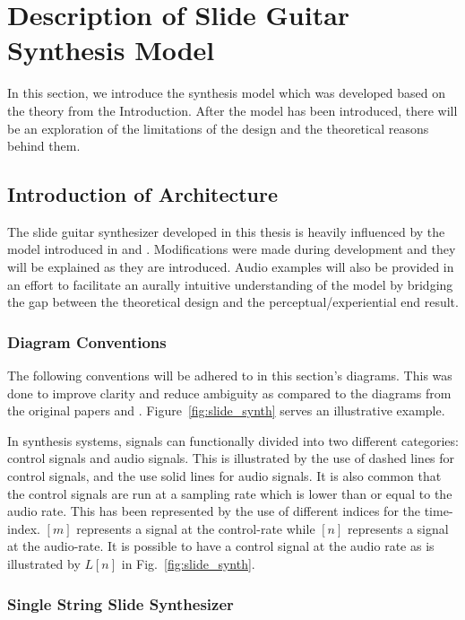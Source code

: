 \documentclass[../main.tex]{subfiles}
\begin{document}
\chapter{Description of Slide Guitar Synthesis Model}
In this section, we introduce the synthesis model which was developed based on the theory from the Introduction. After the model has been introduced, there will be an exploration of the limitations of the design and the theoretical reasons behind them.

\section{Introduction of Architecture}
The slide guitar synthesizer developed in this thesis is heavily influenced by the model introduced in  and . Modifications were made during development and they will be explained as they are introduced. Audio examples will also be provided in an effort to facilitate an aurally intuitive understanding of the model by bridging the gap between the theoretical design and the perceptual/experiential end result.

\subsection{Diagram Conventions}
The following conventions will be adhered to in this section's diagrams. This was done to improve clarity and reduce ambiguity as compared to the diagrams from the original papers  and . Figure~\ref{fig:slide_synth} serves an illustrative example.

In synthesis systems, signals can functionally divided into two different categories: control signals and audio signals. This is illustrated by the use of dashed lines for control signals, and the use solid lines for audio signals. It is also common that the control signals are run at a sampling rate which is lower than or equal to the audio rate. This has been represented by the use of different indices for the time-index. $[m]$ represents a signal at the control-rate while $[n]$ represents a signal at the audio-rate. It is possible to have a control signal at the audio rate as is illustrated by $L[n]$ in Fig.~\ref{fig:slide_synth}.

\subsection{Single String Slide Synthesizer}
\end{document}
